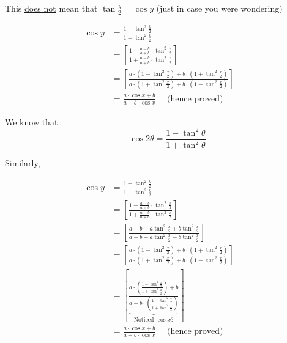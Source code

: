 \documentclass[14pt,fleqn]{extarticle}
\newcommand\tsqx{\tan^2\frac{x}{2}}
\newcommand\tsqy{\tan^2 \frac{y}{2}}
\newcommand\ea{\frac{a-b}{a+b}}
\begin{document}
\begin{problem}
\begin{step}
This \underline{does not} mean that $\tan \frac{y}{2} = \cos y$ (just in case you 
were wondering) 

\end{step}

\begin{step}
  \begin{options} 
     \correct 
     
     \begin{align}
	\cos y &= \frac{1 - \tsqy}{1 + \tsqy} \\
	&= \left[ \frac{1-\ea\cdot\tsqx}{1 + \ea\cdot\tsqx}\right] \\
	&= \left[\frac{a\cdot \left(1-\tsqx \right) + b\cdot \left(1+\tsqx \right)}{a\cdot \left(1+\tsqx \right) + b\cdot \left(1-\tsqx \right)} \right] \\
	&= \frac{a\cdot\cos x + b}{a + b\cdot \cos x}\quad\text{ (hence proved)}
\end{align}

        
    \end{options} 
     \reason 

     We know that 
     \[ \qquad \cos 2\theta = \frac{1-\tan^2\theta}{1+\tan^2\theta}\]
     
     Similarly, 
     
     \begin{align}
	\cos y &= \frac{1 - \tsqy}{1 + \tsqy} \\
	&= \left[ \frac{1-\ea\cdot\tsqx}{1 + \ea\cdot\tsqx}\right] \\
	&= \left[\frac{a+b-a\tsqx + b\tsqx}{a+b+a\tsqx - b\tsqx} \right] \\
	&= \left[\frac{a\cdot \left(1-\tsqx \right) + b\cdot \left(1+\tsqx \right)}{a\cdot \left(1+\tsqx \right) + b\cdot \left(1-\tsqx \right)} \right] \\
	&= \left[\underbrace{\frac{a\cdot \left( \frac{1-\tsqx}{1+\tsqx}\right) + b}{a + b\cdot \left(\frac{1-\tsqx}{1+\tsqx}\right)}}_{\text{Noticed }\cos x?} \right] \\
	&= \frac{a\cdot\cos x + b}{a + b\cdot \cos x}\quad\text{ (hence proved)}
\end{align}
       
\end{step}
\end{problem} 
\end{document}
